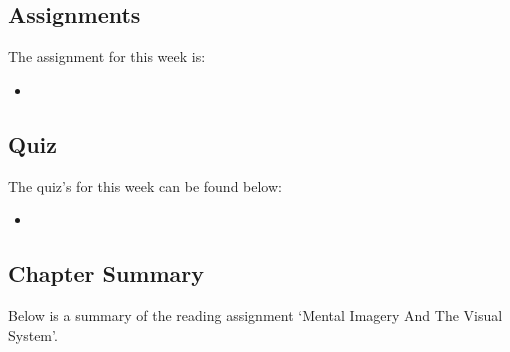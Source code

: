 \subsection{Assignments}

The assignment for this week is:

\begin{itemize}
    \item {}
\end{itemize}

\subsection{Quiz}

The quiz's for this week can be found below:

\begin{itemize}
    \item {}
\end{itemize}

\subsection{Chapter Summary}

Below is a summary of the reading assignment `Mental Imagery And The Visual System'.

